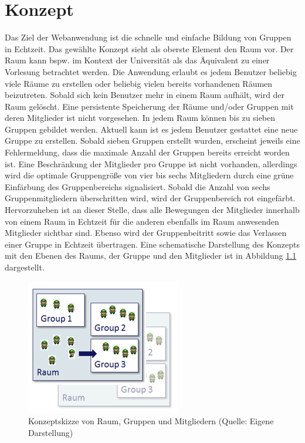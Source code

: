 \chapter{Konzept}
\label{konzept}

Das Ziel der Webanwendung ist die schnelle und einfache Bildung von Gruppen in Echtzeit. Das gewählte Konzept sieht als oberste Element den Raum vor. Der Raum kann bspw. im Kontext der Universität als das Äquivalent zu einer Vorlesung betrachtet werden. Die Anwendung erlaubt es jedem Benutzer beliebig viele Räume zu erstellen oder beliebig vielen bereits vorhandenen Räumen beizutreten. Sobald sich kein Benutzer mehr in einem Raum aufhält, wird der Raum gelöscht. Eine persistente Speicherung der Räume und/oder Gruppen mit deren Mitglieder ist nicht vorgesehen. 
\newline\newline
In jedem Raum können bis zu sieben Gruppen gebildet werden. Aktuell kann ist es jedem Benutzer gestattet eine neue Gruppe zu erstellen. Sobald sieben Gruppen erstellt wurden, erscheint jeweils eine Fehlermeldung, dass die maximale Anzahl der Gruppen bereits erreicht worden ist. Eine Beschränkung der Mitglieder pro Gruppe ist nicht vorhanden, allerdings wird die optimale Gruppengröße von vier bis sechs Mitgliedern durch eine grüne Einfärbung des Gruppenbereichs signalisiert. Sobald die Anzahl von sechs Gruppenmitgliedern überschritten wird, wird der Gruppenbereich rot eingefärbt. Hervorzuheben ist an dieser Stelle, dass alle Bewegungen der Mitglieder innerhalb von einem Raum in Echtzeit für die anderen ebenfalls im Raum anwesenden Mitglieder sichtbar sind. Ebenso wird der Gruppenbeitritt sowie das Verlassen einer Gruppe in Echtzeit übertragen. Eine schematische Darstellung des Konzepts mit den Ebenen des Raums, der Gruppe und den Mitglieder ist in Abbildung \ref{konzeptskizze} dargestellt.

\begin{figure}[h]
\centering
\includegraphics{graphiken/konzeptskizze.png}%
\caption{Konzeptskizze von Raum, Gruppen und Mitgliedern (Quelle: Eigene Darstellung)}%
\label{konzeptskizze}%
\end{figure}

